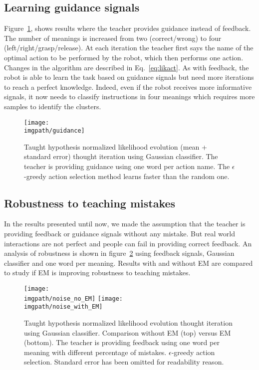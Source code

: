 \subsection{Learning guidance signals}

Figure~\ref{fig:Guidance}, shows results where the teacher provides guidance instead of feedback. The number of meanings is increased from two (correct/wrong) to four (left/right/grasp/release). At each iteration the teacher first says the name of the optimal action to be performed by the robot, which then performs one action. Changes in the algorithm are described in Eq.~\ref{eq:likact}. As with feedback, the robot is able to learn the task based on guidance signals but need more iterations to reach a perfect knowledge. Indeed, even if the robot receives more informative signals, it now needs to classify instructions in four meanings which requires more samples to identify the clusters.  

\begin{figure}[!htbp]
  \centering
  \texttt{[image: \\imgpath/guidance]}
  \caption{Taught hypothesis normalized likelihood evolution (mean + standard error) thought iteration using Gaussian classifier. The teacher is providing guidance using one word per action name. The $\epsilon$-greedy action selection method learns faster than the random one. }
  \label{fig:Guidance}
\end{figure}

\subsection{Robustness to teaching mistakes}

In the results presented until now, we made the assumption that the teacher is providing feedback or guidance signals without any mistake. But real world interactions are not perfect and people can fail in providing correct feedback. An analysis of robustness is shown in figure~\ref{fig:Noise} using feedback signals, Gaussian classifier and one word per meaning. Results with and without EM are compared to study if EM is improving robustness to teaching mistakes.

\begin{figure}[!htbp]
  \centering
  \texttt{[image: \\imgpath/noise\_no\_EM]}
  \texttt{[image: \\imgpath/noise\_with\_EM]}
  \caption{Taught hypothesis normalized likelihood evolution thought iteration using Gaussian classifier. Comparison without EM (top) versus EM (bottom). The teacher is providing feedback using one word per meaning with different percentage of mistakes. $\epsilon$-greedy action selection. Standard error has been omitted for readability reason.}
  \label{fig:Noise}
\end{figure}

